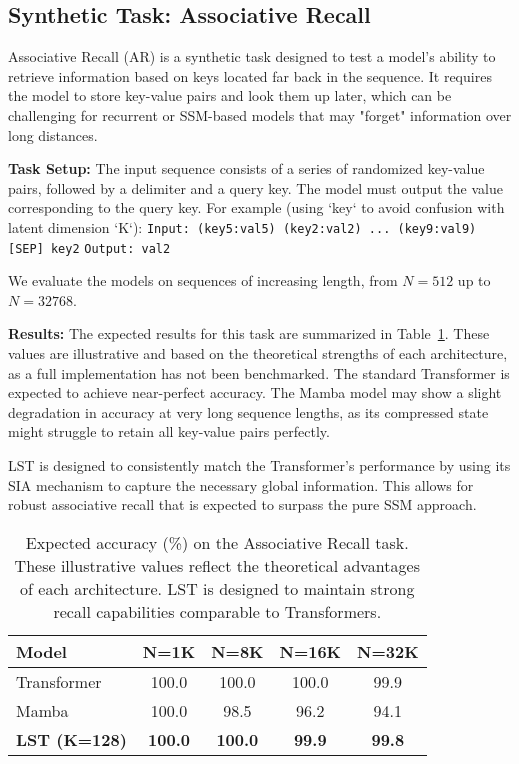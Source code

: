\documentclass[10pt,twocolumn,letterpaper]{article}
\begin{document}
\subsection{Synthetic Task: Associative Recall}

Associative Recall (AR) is a synthetic task designed to test a model's ability to retrieve information based on keys located far back in the sequence. It requires the model to store key-value pairs and look them up later, which can be challenging for recurrent or SSM-based models that may "forget" information over long distances.

\textbf{Task Setup:} The input sequence consists of a series of randomized key-value pairs, followed by a delimiter and a query key. The model must output the value corresponding to the query key. For example (using `key` to avoid confusion with latent dimension `K`):
\texttt{Input: (key5:val5) (key2:val2) ... (key9:val9) [SEP] key2}
\texttt{Output: val2}

We evaluate the models on sequences of increasing length, from \(N=512\) up to \(N=32768\).

\textbf{Results:} The expected results for this task are summarized in Table~\ref{tab:associative_recall}. These values are illustrative and based on the theoretical strengths of each architecture, as a full implementation has not been benchmarked. The standard Transformer is expected to achieve near-perfect accuracy. The Mamba model may show a slight degradation in accuracy at very long sequence lengths, as its compressed state might struggle to retain all key-value pairs perfectly.

LST is designed to consistently match the Transformer's performance by using its SIA mechanism to capture the necessary global information. This allows for robust associative recall that is expected to surpass the pure SSM approach.

\begin{table}[t]
\centering
\small
\begin{tabular}{@{}lcccc@{}}
\toprule
\textbf{Model} & \textbf{N=1K} & \textbf{N=8K} & \textbf{N=16K} & \textbf{N=32K} \\
\midrule
Transformer & 100.0 & 100.0 & 100.0 & 99.9 \\
Mamba & 100.0 & 98.5 & 96.2 & 94.1 \\
\textbf{LST (K=128)} & \textbf{100.0} & \textbf{100.0} & \textbf{99.9} & \textbf{99.8} \\
\bottomrule
\end{tabular}
\caption{Expected accuracy (\%) on the Associative Recall task. These illustrative values reflect the theoretical advantages of each architecture. LST is designed to maintain strong recall capabilities comparable to Transformers.}
\label{tab:associative_recall}
\end{table}
\end{document}
